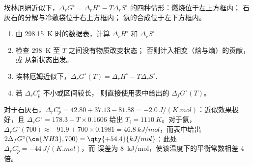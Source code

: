 \begin{omfigure}

{\small 埃林厄姆近似下，$\Delta_r G^\circ = \Delta_r H^\circ - T\Delta_r
S^\circ$ 的四种情形：燃烧位于左上方框内；
石灰石的分解与冷敷袋位于右上方框内；
氨的合成位于左下方框内。}
\end{omfigure}

\begin{method}[温度 $T$ 下的标准反应吉布斯自由能]\label{met:b2:reaction-free-energy:delta-g-standard}
\begin{enumerate}
  \item 由 \qty{298.15}{K} 时的数据表，计算 $\Delta_r H^\circ$ 和
        $\Delta_r S^\circ$.
  \item 检查 \qty{298}{K} 至 $T$ 之间没有物质改变状态；
        否则计入相变（焓与熵）的贡献，或
        从新状态出发。
  \item 埃林厄姆近似下，$\Delta_r G^\circ(T) = \Delta_r H^\circ
        - T\Delta_r S^\circ$.
  \item 若 $\Delta_r C^\circ_p$ 不小或区间较长，
        则直接使用表中给出的 $\Delta_f G^\circ(T)$。
\end{enumerate}
\end{method}

\begin{example}[近似的两项检验]\label{ex:b2:reaction-free-energy:tests}
对于石灰石，$\Delta_r C^\circ_p = 42.80 + 37.13 - 81.88 =
\qty{-2.0}{J/(K.mol)}$：近似效果极好，且 $\Delta_r
G^\circ = 178.3 - T \times 0.1606$ 给出 $T_i = \qty{1110}{K}$。对于氨，
$\Delta_r G^\circ(700) \approx -91.9 + 700 \times 0.1981 =
\qty{+46.8}{kJ/mol}$，而表中给出 $2\Delta_f G^\circ(\ce{NH3}, 700) =
\qty{+54.4}{kJ/mol}$：此处 $\Delta_r C^\circ_p = \qty{-44}{J/(K.mol)}$，而
误差为 \qty{8}{kJ/mol}，使该温度下的平衡常数相差
4 倍。
\end{example}

